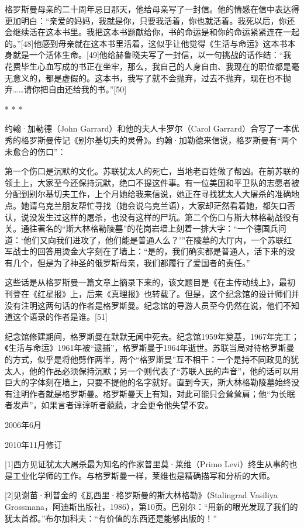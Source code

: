 格罗斯曼母亲的二十周年忌日那天，他给母亲写了一封信。他的情感在信中表达得更加明白：“亲爱的妈妈，我就是你，只要我活着，你也就活着。我死以后，你还会继续活在这本书里。我把这本书题献给你，书的命运是和你的命运紧紧连在一起的。”[48]他感到母亲就在这本书里活着，这似乎让他觉得《生活与命运》这本书本身就是一个活体生命。[49]他给赫鲁晓夫写了一封信，以一句挑战的话作结：“我花费毕生心血写成的书正在坐牢，那么，我自己的人身自由、我现在的职位都是毫无意义的，都是虚假的。这本书，我写了就不会抛弃，过去不抛弃，现在也不抛弃……请你把自由还给我的书。”[50]

* * *

约翰·加勒德（John Garrard）和他的夫人卡罗尔（Carol Garrard）合写了一本优秀的格罗斯曼传记《别尔基切夫的灵骨》。约翰·加勒德来信说，格罗斯曼有“两个未愈合的伤口”：

第一个伤口是沉默的文化。苏联犹太人的死亡，当地老百姓做了帮凶。在前苏联的领土上，大家至今还保持沉默，绝口不提这件事。有一位美国和平卫队的志愿者被分配到别尔基切夫工作，上个月她给我来信说，她正在寻找犹太人大屠杀的准确地点。她请乌克兰朋友帮忙寻找（她会说乌克兰语），大家却茫然看着她，都矢口否认，说没发生过这样的屠杀，也没有这样的尸坑。第二个伤口与斯大林格勒战役有关。通往著名的“斯大林格勒陵墓”的花岗岩墙上刻着一排大字：“一个德国兵问道：‘他们又向我们进攻了，他们能是普通人么？’”在陵墓的大厅内，一个苏联红军战士的回答用烫金大字刻在了墙上：“是的，我们确实都是普通人，活下来的没有几个，但是为了神圣的俄罗斯母亲，我们都履行了爱国者的责任。”

这些话是从格罗斯曼一篇文章上摘录下来的，该文题目是《在主传动线上》，最初刊登在《红星报》上，后来《真理报》也转载了。但是，这个纪念馆的设计师们并没有注明这两句话的作者是格罗斯曼。纪念馆的导游人员至今仍然在说，他们不知道这个语录的作者是谁。[51]

纪念馆修建期间，格罗斯曼在默默无闻中死去。纪念馆1959年奠基，1967年完工；《生活与命运》1961年被“逮捕”，格罗斯曼于1964年逝世。苏联当局对待格罗斯曼的方式，似乎是将他劈作两半，两个“格罗斯曼”互不相干：一个是持不同政见的犹太人，他的作品必须保持沉默；另一个则代表了“苏联人民的声音”，他的话可以用巨大的字体刻在墙上，只要不提他的名字就好。直到今天，斯大林格勒陵墓始终没有注明作者就是格罗斯曼。格罗斯曼天上有知，对此可能只会耸耸肩；他“为长眠者发声”，如果言者谆谆听者藐藐，才会更令他失望不安。

2006年6月

2010年11月修订

[1]西方见证犹太大屠杀最为知名的作家普里莫·莱维（Primo Levi）终生从事的也是工业化学师的工作。与格罗斯曼一样，莱维也是精确描写和分析的大师。

[2]见谢苗·利普金的《瓦西里·格罗斯曼的斯大林格勒》（Stalingrad Vasiliya Grossmana，阿迪斯出版社，1986），第10页。巴别尔：“用新的眼光发现了我们的犹太首都。”布尔加科夫：“有价值的东西还是能够出版的！”

